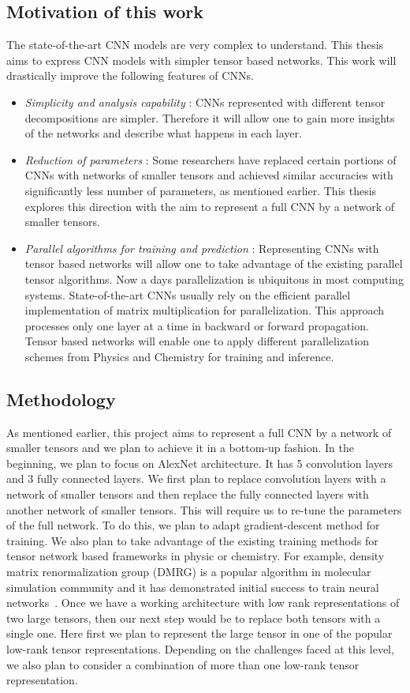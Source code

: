 \documentclass[11pt]{article}
\begin{document}
\subsection*{Motivation of this work}
The state-of-the-art CNN models are very complex to understand. This thesis aims to express CNN models with simpler tensor based networks.  This work will  drastically improve the following features of CNNs.
\begin{itemize}
	\item \emph{Simplicity and analysis capability} :  CNNs represented with different tensor decompositions are simpler. Therefore it will allow one to gain more insights of the networks and describe what happens in each layer.
	\item \emph{Reduction of parameters} : Some researchers have replaced certain portions of CNNs with  networks of smaller tensors and achieved  similar accuracies with significantly less number of parameters, as mentioned earlier. This thesis explores this direction with the aim to represent a full CNN by a network of smaller tensors. 
	\item \emph{Parallel algorithms for training and prediction} : Representing CNNs with tensor based networks will allow one to take advantage of the existing parallel tensor algorithms. Now a days parallelization is ubiquitous in most computing systems. State-of-the-art CNNs usually rely on the efficient parallel implementation of matrix multiplication for parallelization. This approach processes only one layer at a time in backward or forward propagation. Tensor based networks will enable one to apply different parallelization schemes from Physics and Chemistry for training and inference.
\end{itemize}


\subsection*{Methodology}
As mentioned earlier, this project aims to represent a full CNN by a network of smaller tensors and we plan to achieve it in a bottom-up fashion. In the beginning, we plan to focus on AlexNet architecture. It has 5 convolution layers and 3 fully connected layers. We first plan to replace convolution layers with a network of smaller tensors and then replace the fully connected layers with another network of smaller tensors. This will require us to re-tune the parameters of the full network. To do this, we plan to adapt gradient-descent method for training. We also plan to take advantage of the existing training methods for tensor network based frameworks in physic or chemistry. For example, density matrix renormalization group (DMRG) is a popular algorithm in molecular simulation community and it has demonstrated initial success to train neural networks~\cite{SS-NIPS2016}. Once we have a working architecture with low rank representations of two large tensors, then our next step would be to replace both tensors with a single one. Here first we plan to represent the large tensor in one of the popular low-rank tensor representations. Depending on the challenges faced at this level, we also plan to consider a combination of more than one low-rank tensor representation.    
\end{document}
